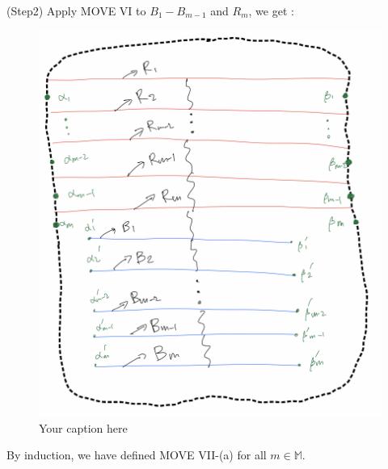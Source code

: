 (Step2) Apply MOVE \RN{6} to $B_1 - B_{m-1}$ and $R_m$, we get :
\begin{figure}[H] %
    \centering
    \includegraphics[width=\linewidth]{diagrams/definition7/4.png} %
    \caption{Your caption here}
    \label{fig:your-label}
\end{figure}
By induction, we have defined MOVE \RN{7}-(a) for all $m\in \mathbb{M}$.

